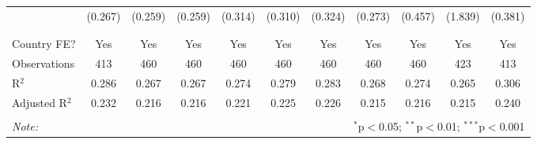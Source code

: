\begin{table}[!htbp]
\begin{tabular}{@{\extracolsep{5pt}}lcccccccccc}
  & (0.267) & (0.259) & (0.259) & (0.314) & (0.310) & (0.324) & (0.273) & (0.457) & (1.839) & (0.381) \\ 
  & & & & & & & & & & \\ 
\hline \\[-1.8ex] 
Country FE? & Yes & Yes & Yes & Yes & Yes & Yes & Yes & Yes & Yes & Yes \\ 
Observations & 413 & 460 & 460 & 460 & 460 & 460 & 460 & 460 & 423 & 413 \\ 
R$^{2}$ & 0.286 & 0.267 & 0.267 & 0.274 & 0.279 & 0.283 & 0.268 & 0.274 & 0.265 & 0.306 \\ 
Adjusted R$^{2}$ & 0.232 & 0.216 & 0.216 & 0.221 & 0.225 & 0.226 & 0.215 & 0.216 & 0.215 & 0.240 \\ 
\hline 
\hline \\[-1.8ex] 
\textit{Note:}  & \multicolumn{10}{r}{$^{*}$p$<$0.05; $^{**}$p$<$0.01; $^{***}$p$<$0.001} \\ 
\end{tabular} 
\end{table} 
